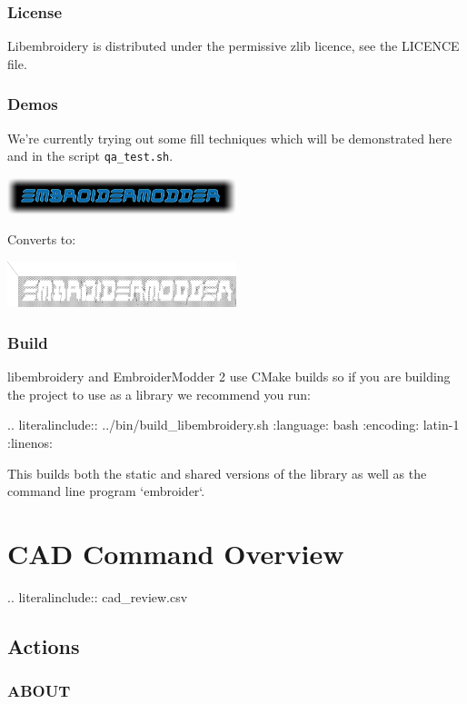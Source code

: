 \documentclass[11pt]{report}
\begin{document}
\subsection{License}

Libembroidery is distributed under the permissive zlib licence, see the LICENCE file.

\subsection{Demos}

We're currently trying out some fill techniques which will be demonstrated here
and in the script \texttt{qa\_test.sh}.

\includegraphics[width=0.5\textwidth]{images/logo-spirals.png}

Converts to:

\includegraphics[width=0.5\textwidth]{images/logo_spirals_cross_stitch.png}

\subsection{Build}

libembroidery and EmbroiderModder 2 use CMake builds
so if you are building the project to use as a library we recommend
you run:

.. literalinclude:: ../bin/build\_libembroidery.sh
   :language: bash
   :encoding: latin-1
   :linenos:

This builds both the static and shared versions of the library as well
as the command line program `embroider`.

\chapter{CAD Command Overview}

.. literalinclude:: cad\_review.csv

\section{Actions}

\subsection{ABOUT}
\end{document}
